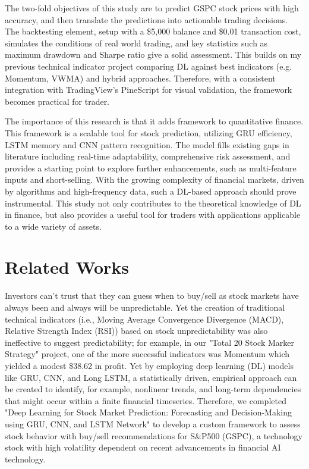 The two-fold objectives of this study are to predict GSPC stock prices with high accuracy, and then translate the predictions into actionable trading decisions. The backtesting element, setup with a \$5,000 balance and \$0.01 transaction cost, simulates the conditions of real world trading, and key statistics such as maximum drawdown and Sharpe ratio give a solid assessment. This builds on my previous technical indicator project comparing DL against best indicators (e.g. Momentum, VWMA) and hybrid approaches. Therefore, with a consistent integration with TradingView’s PineScript for visual validation, the framework becomes practical for trader.

The importance of this research is that it adds framework to quantitative finance. This framework is a scalable tool for stock prediction, utilizing GRU efficiency, LSTM memory and CNN pattern recognition. The model fills existing gaps in literature including real-time adaptability, comprehensive risk assessment, and provides a starting point to explore further enhancements, such as multi-feature inputs and short-selling. With the growing complexity of financial markets, driven by algorithms and high-frequency data, such a DL-based approach should prove instrumental. This study not only contributes to the theoretical knowledge of DL in finance, but also provides a useful tool for traders with applications applicable to a wide variety of assets.

\section{Related Works}

Investors can't trust that they can guess when to buy/sell as stock markets have always been and always will be unpredictable. Yet the creation of traditional technical indicators (i.e., Moving Average Convergence Divergence (MACD), Relative Strength Index (RSI)) based on stock unpredictability was also ineffective to suggest predictability; for example, in our "Total 20 Stock Marker Strategy" project, one of the more successful indicators was Momentum which yielded a modest \$38.62 in profit. Yet by employing deep learning (DL) models like GRU, CNN, and Long LSTM, a statistically driven, empirical approach can be created to identify, for example, nonlinear trends, and long-term dependencies that might occur within a finite financial timeseries. Therefore, we completed "Deep Learning for Stock Market Prediction: Forecasting and
Decision-Making using GRU, CNN, and LSTM Network" to develop a custom framework to assess stock behavior with buy/sell recommendations for S\&P500 (GSPC), a technology stock with high volatility dependent on recent advancements in financial AI technology.

